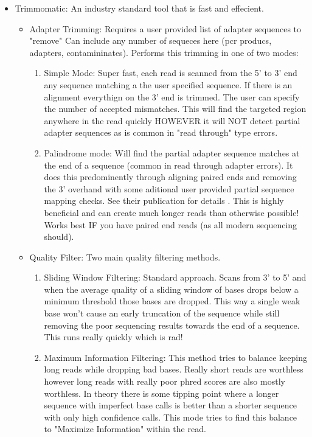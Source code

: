 \documentclass{article}
\begin{document}
\begin{itemize}
\begin{itemize}
            \end{itemize}
        \item Trimmomatic: \cite{bolgerTrimmomaticFlexibleTrimmer2014} An industry standard tool that is fast and effecient.   
            \begin{itemize}
                \item Adapter Trimming:   Requires a user provided list of adapter sequences to "remove"   Can include any number of sequeces here (pcr producs, adapters, contamininates).   Performs this trimming in one of two modes:
                    \begin{enumerate}
                        \item Simple Mode:  Super fast, each read is scanned from the 5' to 3' end any sequence matching a the user specified sequence.   If there is an alignment everythign on the 3' end is trimmed.  The user can specify the number of accepted mismatches.  This will find the targeted region anywhere in the read quickly HOWEVER it will NOT detect partial adapter sequences as is common in "read through" type errors.
                        \item Palindrome mode:  Will find the partial adapter sequence matches at the end of a sequence (common in read through adapter errors).  It does this predominently through aligning paired ends and removing the 3' overhand with some aditional user provided partial sequence mapping checks.  See their publication for details \cite{bolgerTrimmomaticFlexibleTrimmer2014}.   This is highly beneficial and can create much longer reads than otherwise possible!   Works best IF you have paired end reads (as all modern sequencing should).
                    \end{enumerate}
                    \item Quality Filter:  Two main quality filtering methods.
                    \begin{enumerate}
                        \item Sliding Window Filtering: Standard approach.  Scans from 3' to 5' and when the average quality of a sliding window of bases drops below a minimum threshold those bases are dropped.    This way a single weak base won't cause an early truncation of the sequence while still removing the poor sequencing results towards the end of a sequence.  This runs really quickly which is rad!
                        \item Maximum Information Filtering: This method tries to balance keeping long reads while dropping bad bases.  Really short reads are worthless however long reads with really poor phred scores are also mostly worthless.   In theory there is some tipping point where a longer sequence with imperfect base calls is better than a shorter sequence with only high confidence calls.   This mode tries to find this balance to "Maximize Information" within the read.

\end{enumerate}
\end{itemize}
\end{itemize}
\end{document}
